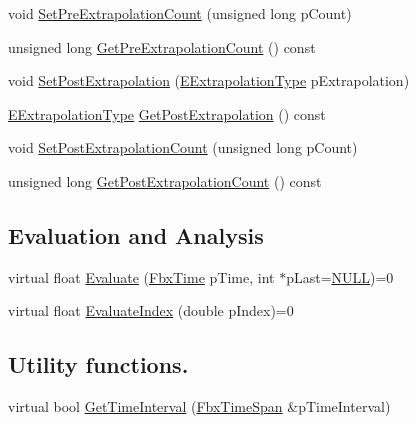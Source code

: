 \begin{DoxyCompactItemize}
\item 
void \hyperlink{class_fbx_anim_curve_base_a9103e7ae34ef31d2952df0684cda6754}{Set\+Pre\+Extrapolation\+Count} (unsigned long p\+Count)
\item 
unsigned long \hyperlink{class_fbx_anim_curve_base_a2b8d645a376937f0aa645e25373976e0}{Get\+Pre\+Extrapolation\+Count} () const
\item 
void \hyperlink{class_fbx_anim_curve_base_a80e57bd8e710d36348eeb326fd83951b}{Set\+Post\+Extrapolation} (\hyperlink{class_fbx_anim_curve_base_aa7214d43daa7b6b9b47a8118a858847f}{E\+Extrapolation\+Type} p\+Extrapolation)
\item 
\hyperlink{class_fbx_anim_curve_base_aa7214d43daa7b6b9b47a8118a858847f}{E\+Extrapolation\+Type} \hyperlink{class_fbx_anim_curve_base_acabeaab2cff8753d0411eb0b4e268dc5}{Get\+Post\+Extrapolation} () const
\item 
void \hyperlink{class_fbx_anim_curve_base_a4201935f2bc54e924658cc0dd4e7bf74}{Set\+Post\+Extrapolation\+Count} (unsigned long p\+Count)
\item 
unsigned long \hyperlink{class_fbx_anim_curve_base_a2ccd05e435a7f010759c947815c55475}{Get\+Post\+Extrapolation\+Count} () const
\end{DoxyCompactItemize}
\subsection*{Evaluation and Analysis}
\begin{DoxyCompactItemize}
\item 
virtual float \hyperlink{class_fbx_anim_curve_base_a6d31c045a3733067fc7b4e6416d2fe06}{Evaluate} (\hyperlink{class_fbx_time}{Fbx\+Time} p\+Time, int $\ast$p\+Last=\hyperlink{fbxarch_8h_a070d2ce7b6bb7e5c05602aa8c308d0c4}{N\+U\+LL})=0
\item 
virtual float \hyperlink{class_fbx_anim_curve_base_aa54f5c0c77e553be03ba888448dc1818}{Evaluate\+Index} (double p\+Index)=0
\end{DoxyCompactItemize}
\subsection*{Utility functions.}
\begin{DoxyCompactItemize}
\item 
virtual bool \hyperlink{class_fbx_anim_curve_base_a4d259319e514c5371ff184b0cc7f7cd6}{Get\+Time\+Interval} (\hyperlink{class_fbx_time_span}{Fbx\+Time\+Span} \&p\+Time\+Interval)
\end{DoxyCompactItemize}
